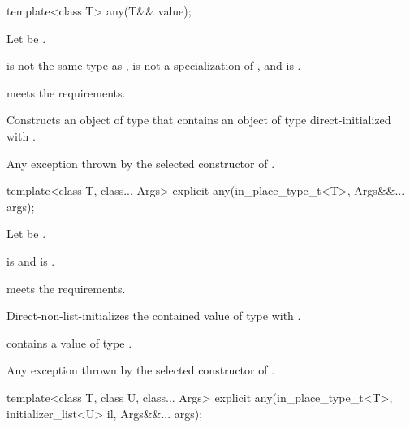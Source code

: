 %
\begin{itemdecl}
template<class T>
  any(T&& value);
\end{itemdecl}

\begin{itemdescr}
\pnum
Let  be .

\pnum
\constraints
{} is not the same type as ,
 is not a specialization of ,
and  is .

\pnum
\expects
{} meets the  requirements.

\pnum
\effects
Constructs an object of type  that contains an object of type  direct-initialized with .

\pnum
\throws
Any exception thrown by the selected constructor of .
\end{itemdescr}

%
\begin{itemdecl}
template<class T, class... Args>
  explicit any(in_place_type_t<T>, Args&&... args);
\end{itemdecl}

\begin{itemdescr}
\pnum
Let  be .

\pnum
\constraints
{} is  and
 is .

\pnum
\expects
{} meets the  requirements.

\pnum
\effects
Direct-non-list-initializes the contained value of type 
with .

\pnum
\ensures
{} contains a value of type .

\pnum
\throws
Any exception thrown by the selected constructor of .
\end{itemdescr}

%
\begin{itemdecl}
template<class T, class U, class... Args>
  explicit any(in_place_type_t<T>, initializer_list<U> il, Args&&... args);
\end{itemdecl}

